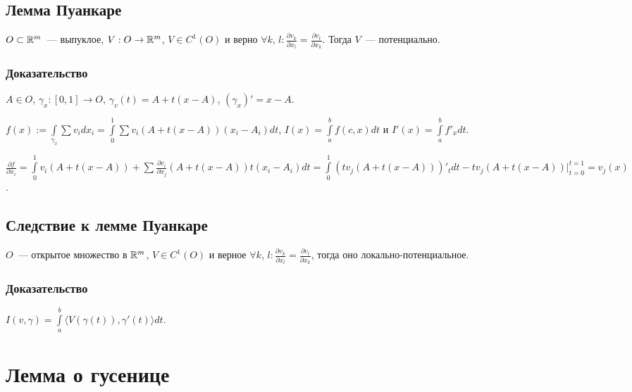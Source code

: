\documentclass{article}
\begin{document}
        \subsection{Лемма Пуанкаре}
        
            $O \subset \mathbb{R}^m$~--- выпуклое, $V : O \rightarrow \mathbb{R}^m$, $V \in C^1(O)$ и верно $\forall k$, $l : \frac{\partial v_k}{\partial x_l} = \frac{\partial v_l}{\partial x_k}$. Тогда $V$~--- потенциально.
            
            \subsubsection{Доказательство}
            
                $A \in O$, $\gamma_x : [0, 1] \rightarrow O$, $\gamma_v(t) = A + t(x - A)$, $(\gamma_x)' = x - A$.
                
                $f(x) := \int\limits_{\gamma_x} \sum v_i dx_i = \int\limits^1_0 \sum v_i \left( A + t \left( x - A \right) \right) \left( x_i - A_i \right) dt$, $I(x) = \int\limits^b_a f(c, x)dt$ и $I'(x) = \int\limits^b_a f'_x dt$.
                
                $\frac{\partial f}{\partial x_i} = \int\limits^1_0 v_i \left( A + t \left( x - A \right) \right) + \sum \frac{\partial v_i}{\partial x_j} \left( A + t \left( x - A \right) \right) t \left( x_i - A_i \right) dt = \int\limits^1_0 \left( t v_j \left( A + t \left( x - A \right) \right) \right)'_t dt - t v_j \left( A + t \left( x - A \right) \right) \bigg|^{t = 1}_{t = 0} = v_j(x)$.
        
        \subsection{Следствие к лемме Пуанкаре}
        
            $O$~--- открытое множество в $\mathbb{R}^m$, $V \in C^1(O)$ и верное $\forall k$, $l : \frac{\partial v_k}{\partial x_l} = \frac{\partial v_l}{\partial x_k}$, тогда оно локально-потенциальное.
            
            \subsubsection{Доказательство}
            
                $I(v, \gamma) = \int\limits^b_a \langle V \left( \gamma(t) \right), \gamma'(t) \rangle dt$.
    \newpage
    
    \section{Лемма о гусенице}
    
\end{document}
